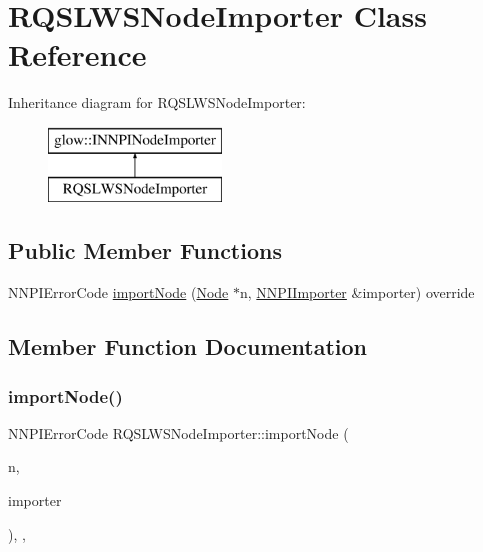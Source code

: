 \hypertarget{class_r_q_s_l_w_s_node_importer}{}\section{R\+Q\+S\+L\+W\+S\+Node\+Importer Class Reference}
\label{class_r_q_s_l_w_s_node_importer}
Inheritance diagram for R\+Q\+S\+L\+W\+S\+Node\+Importer\+:\begin{figure}[H]
\begin{center}
\leavevmode
\includegraphics[height=2.000000cm]{class_r_q_s_l_w_s_node_importer}
\end{center}
\end{figure}
\subsection*{Public Member Functions}
\begin{DoxyCompactItemize}
\item 
N\+N\+P\+I\+Error\+Code \hyperlink{class_r_q_s_l_w_s_node_importer_a443715c37be8a1a72d089e406a356538}{import\+Node} (\hyperlink{classglow_1_1_node}{Node} $\ast$n, \hyperlink{classglow_1_1_n_n_p_i_importer}{N\+N\+P\+I\+Importer} \&importer) override
\end{DoxyCompactItemize}


\subsection{Member Function Documentation}
\mbox{\label{class_r_q_s_l_w_s_node_importer_a443715c37be8a1a72d089e406a356538}} 
\subsubsection{\texorpdfstring{import\+Node()}{importNode()}}
{\footnotesize\ttfamily N\+N\+P\+I\+Error\+Code R\+Q\+S\+L\+W\+S\+Node\+Importer\+::import\+Node (\begin{DoxyParamCaption}\item[{\hyperlink{classglow_1_1_node}{Node} $\ast$}]{n,  }\item[{\hyperlink{classglow_1_1_n_n_p_i_importer}{N\+N\+P\+I\+Importer} \&}]{importer }\end{DoxyParamCaption})\hspace{0.3cm}{\ttfamily [inline]}, {\ttfamily [override]}, {\ttfamily [virtual]}}

